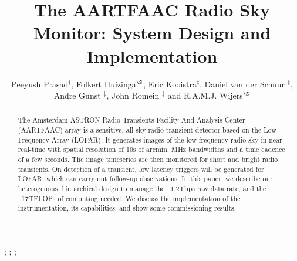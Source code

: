 \documentclass{ws-jai}
\begin{document}
\catchline{}{}{}{}{} %


\title{The AARTFAAC Radio Sky Monitor: System Design and Implementation}

\author{Peeyush Prasad$^\dagger$, Folkert Huizinga$^\S$, Eric Kooistra$^\ddagger$, Daniel van der Schuur $^\ddagger$, Andre Gunst $^\ddagger$, John Romein $^\ddagger$ and R.A.M.J. Wijers$^\S$}

\address{
$^\dagger$Anton Pannekoek Institute, University of Amsterdam, Amsterdam, The Netherlands, p.prasad@uva.nl\\
$^\ddagger$ASTRON, Oude Hoogeveensedijk, 7991PD, The Netherlands\\
$^\S$Anton Pannekoek Institute, University of Amsterdam, Amsterdam\\
}

\maketitle


\begin{history}
;
;
;
\end{history}

\begin{abstract}
The Amsterdam-ASTRON  Radio Transients  Facility And Analysis  Center (AARTFAAC)
array  is  a sensitive,  all-sky  radio  transient  detector  based on  the  Low
Frequency Array (LOFAR).  It generates images  of the low frequency radio sky in
near real-time  with spatial resolution of  10s of arcmin, MHz  bandwidths and a
time cadence of a few seconds. The image timeseries are then monitored for short
and bright radio  transients. On detection of a transient,  low latency triggers
will be  generated for LOFAR,  which can  carry out follow-up  observations.  In
this  paper, we  describe our  heterogenous, hierarchical  design to  manage the
~1.2Tbps raw data  rate, and the ~17TFLOPs of computing  needed.  We discuss the
implementation  of   the  instrumentation,  its  capabilities,   and  show  some
commissioning results.
\end{abstract}

\end{document}
